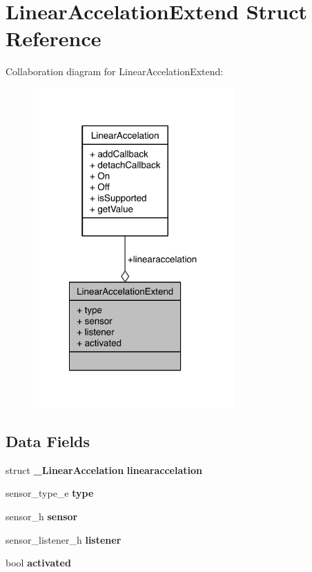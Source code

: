 \section{Linear\-Accelation\-Extend Struct Reference}
\label{structLinearAccelationExtend}


Collaboration diagram for Linear\-Accelation\-Extend\-:\nopagebreak
\begin{figure}[H]
\begin{center}
\leavevmode
\includegraphics[width=218pt]{structLinearAccelationExtend__coll__graph}
\end{center}
\end{figure}
\subsection*{Data Fields}
\begin{DoxyCompactItemize}
\item 
struct {\bf \-\_\-\-Linear\-Accelation} {\bfseries linearaccelation}\label{structLinearAccelationExtend_a41b8fe97ecff36989797201606626969}

\item 
sensor\-\_\-type\-\_\-e {\bfseries type}\label{structLinearAccelationExtend_a255acaa4eb38e1889b5c75fe36ade2a3}

\item 
sensor\-\_\-h {\bfseries sensor}\label{structLinearAccelationExtend_a23279818c7e824514c8f76e6f30dda20}

\item 
sensor\-\_\-listener\-\_\-h {\bfseries listener}\label{structLinearAccelationExtend_a40af9416ae377a41cc20b9dfdf223a91}

\item 
bool {\bfseries activated}\label{structLinearAccelationExtend_a59063436fab475ab35ca239138058d54}

\end{DoxyCompactItemize}


